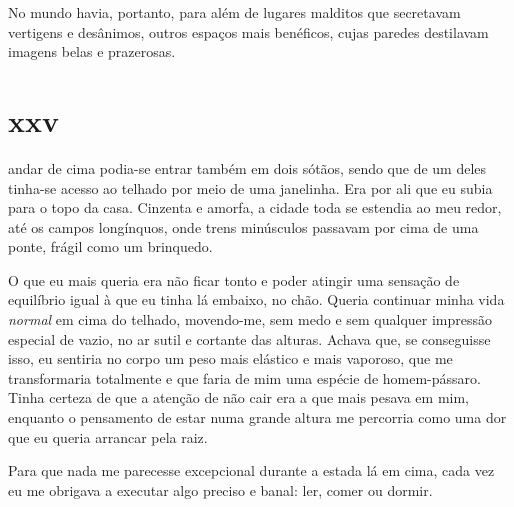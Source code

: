 

No mundo havia, portanto, para além de lugares malditos que secretavam
vertigens e desânimos, outros espaços mais benéficos, cujas paredes
destilavam imagens belas e prazerosas.



\section{xxv} 

 andar de cima podia-se entrar também em dois sótãos, sendo que
 de um deles tinha-se acesso ao telhado por meio de uma janelinha. Era por
 ali que eu subia para o topo da casa. Cinzenta e amorfa, a cidade toda se
 estendia ao meu redor, até os campos longínquos, onde trens minúsculos
 passavam por cima de uma ponte, frágil como um brinquedo.

O que eu mais queria era não ficar tonto e poder atingir uma sensação de
equilíbrio igual à que eu tinha lá embaixo, no chão. Queria continuar minha
vida \textit{normal} em cima do telhado, movendo-me, sem medo e sem qualquer
impressão especial de vazio, no ar sutil e cortante das alturas. Achava que,
se conseguisse isso, eu sentiria no corpo um peso mais elástico e mais
vaporoso, que me transformaria totalmente e que faria de mim uma espécie de
homem-pássaro. Tinha certeza de que a atenção de não cair era a que mais
pesava em mim, enquanto o pensamento de estar numa grande altura me percorria
como uma dor que eu queria arrancar pela raiz.

Para que nada me parecesse excepcional durante a estada lá em cima, cada vez
eu me obrigava a executar algo preciso e banal: ler, comer ou dormir.


